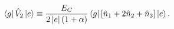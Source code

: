 \documentclass[%
superscriptaddress,
preprint,
preprintnumbers,
bibnotes,
amsmath,
amssymb,
aps,
showkeys,
prb,
]{revtex4-2}
\newcommand{\iket}[1]{\ensuremath{\Ket{#1}}}
\newcommand{\ibra}[1]{\ensuremath{\Bra{#1}}}
\newcommand{\iketbra}[2]{\ket{#1}\bra{#2}}
\newcommand{\iabs}[1]{\ensuremath{\left|#1\right|}}
\newcommand{\iaverage}[1]{\ensuremath{\left\langle #1 \right\rangle}}
\begin{document}
    \begin{equation}
    \label{eq:dipole_voltage_6}
    \ibra{g}\hat{V}_2 \iket{e} \equiv \frac{E_{C}}{2 \iabs{e} (1+\alpha)}\ibra{g}\left[\hat{n}_1  +  2\hat{n}_{2}
        +\hat{n}_3 \right]\iket{e}.
  \end{equation}









\end{document}
